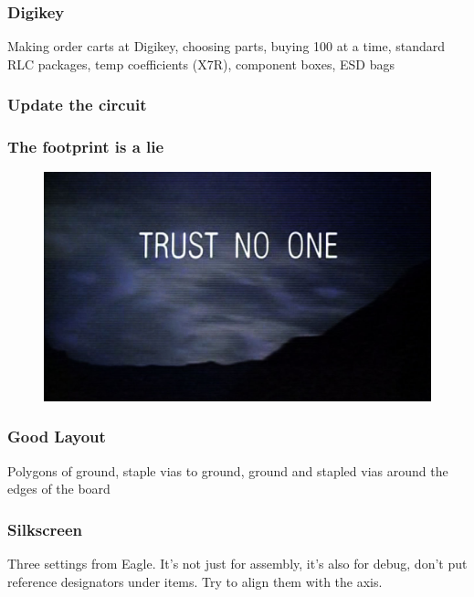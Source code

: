 \documentclass{beamer}
\begin{document}

\begin{frame}
\frametitle{Digikey}
Making order carts at Digikey, choosing parts, buying 100 at a time, standard RLC packages, temp coefficients (X7R), component boxes, ESD bags
\end{frame}


\begin{frame}
\frametitle{Update the circuit}
\end{frame}


\begin{frame}
\frametitle{The footprint is a lie}
\begin{figure}
\includegraphics[width=0.8\linewidth]{trustnoone.jpg}
\end{figure}
\end{frame}


\begin{frame}
\frametitle{Good Layout}
Polygons of ground, staple vias to ground, ground and stapled vias around the edges of the board
\end{frame}


\begin{frame}
\frametitle{Silkscreen}
Three settings from Eagle. It's not just for assembly, it's also for debug, don't put reference designators under items. Try to align them with the axis.
\end{frame}

\end{document}
